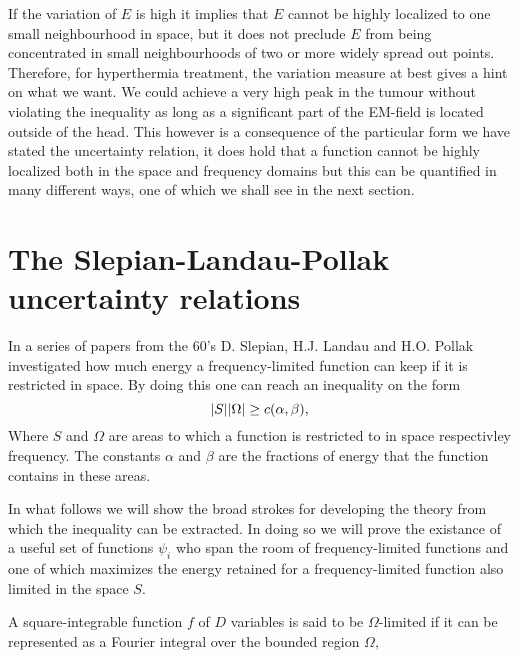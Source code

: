 \documentclass[11pt,a4paper, 
swedish,english %
]{article}
\begin{document}
If the variation of $E$ is high it implies that $E$ cannot be highly localized to one small neighbourhood in space, but it does not preclude $E$ from being concentrated in small neighbourhoods of two or more widely spread out points. Therefore, for hyperthermia treatment, the variation measure at best gives a hint on what we want. We could achieve a very high peak in the tumour without violating the inequality as long as a significant part of the EM-field is located outside of the head.
This however is a consequence of the particular form we have stated the uncertainty relation, it does hold that a function cannot be highly localized both in the space and frequency domains but this can be quantified in many different ways, one of which we shall see in the next section.


\section{The Slepian-Landau-Pollak uncertainty relations}
In a series of papers from the 60's D. Slepian, H.J. Landau and H.O. Pollak investigated how much energy a frequency-limited function can keep if it is restricted in space. By doing this one can reach an inequality on the form
\begin{equation}
\abs{S}\abs{\Omega} \geq c(\alpha,\beta),
\end{equation}
Where $S$ and $\Omega$ are areas to which a function is restricted to in space respectivley frequency. The constants $\alpha$ and $\beta$ are the fractions of energy that the function contains in these areas. 

In what follows we will show the broad strokes for developing the theory from which the inequality can be extracted. In doing so we will prove the existance of a useful set of functions ${\psi_i}$ who span the room of frequency-limited functions and one of which maximizes the energy retained for a frequency-limited function also limited in the space $S$.

A square-integrable function $f$ of $D$ variables is said to be $\Omega$-limited if it can be represented as a Fourier integral over the bounded region $\Omega$,
\end{document}
